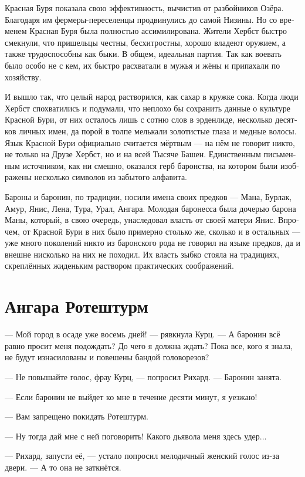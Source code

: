 \documentclass[a4paper,12pt,fleqn]{book}\usepackage{cooltooltips}\usepackage{polyglossia}\setdefaultlanguage[babelshorthands=true]{russian}\setotherlanguage{english}\defaultfontfeatures{Ligatures=TeX,Mapping=tex-text} \usepackage{xcolor}\definecolor{lightgray}{HTML}{bbbbbb}\color{lightgray}\newcommand{\ml}[3]{\textenglish{\textcolor{black}{#3}}}
\begin{document}
Красная Буря показала свою эффективность, вычистив от разбойников Озёра.
Благодаря им фермеры-переселенцы продвинулись до самой Низины.
Но со временем Красная Буря была полностью ассимилирована.
Жители Хербст быстро смекнули, что пришельцы честны, бесхитростны, хорошо владеют оружием, а также трудоспособны как быки.
В общем, идеальная партия.
Так как воевать было особо не с кем, их быстро расхватали в мужья и жёны и припахали по хозяйству.

И вышло так, что целый народ растворился, как сахар в кружке сока.
Когда люди Хербст спохватились и подумали, что неплохо бы сохранить данные о культуре Красной Бури, от них осталось лишь с сотню слов в эрденлиде, несколько десятков личных имен, да порой в толпе мелькали золотистые глаза и медные волосы.
Язык Красной Бури официально считается мёртвым --- на нём не говорит никто, не только на Друзе Хербст, но и на всей Тысяче Башен.
Единственным письменным источником, как ни смешно, оказался герб баронства, на котором были изображены несколько символов из забытого алфавита.

Бароны и баронин, по традиции, носили имена своих предков --- Мана, Бурлак, Амур, Янис, Лена, Тура, Урал, Ангара.
Молодая баронесса была дочерью барона Маны, который, в свою очередь, унаследовал власть от своей матери Янис.
Впрочем, от Красной Бури в них было примерно столько же, сколько и в остальных --- уже много поколений никто из баронского рода не говорил на языке предков, да и внешне нисколько на них не походил.
Их власть зыбко стояла на традициях, скреплённых жиденьким раствором практических соображений.

\section{Ангара Ротештурм}

--- Мой город в осаде уже восемь дней! --- рявкнула Курц.
--- А баронин всё равно просит меня подождать?
До чего я должна ждать?
Пока все, кого я знала, не будут изнасилованы и повешены бандой головорезов?

--- Не повышайте голос, фрау Курц, --- попросил Рихард.
--- Баронин занята. 

--- Если баронин не выйдет ко мне в течение десяти минут, я уезжаю!

--- Вам запрещено покидать Ротештурм.

--- Ну тогда дай мне с ней поговорить!
Какого дьявола меня здесь удер...

--- Рихард, запусти её, --- устало попросил мелодичный женский голос из-за двери.
--- А то она не заткнётся.
\end{document}
